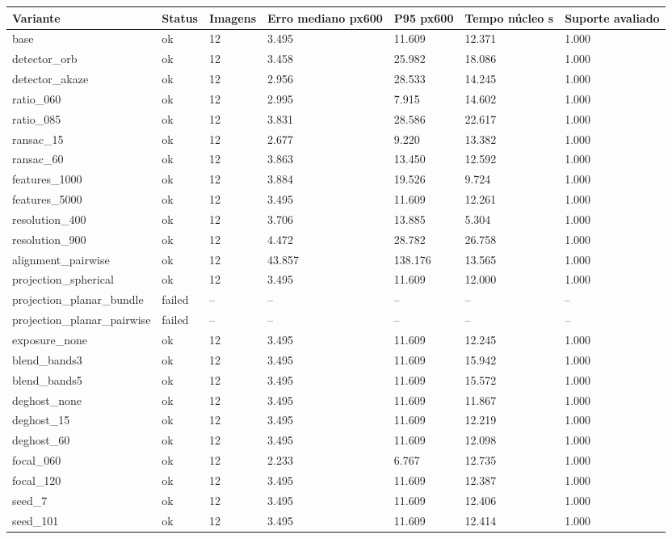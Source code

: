 \begin{tabular}{lllllll}
\hline
Variante & Status & Imagens & Erro mediano px600 & P95 px600 & Tempo núcleo s & Suporte avaliado \\ \hline
base & ok & 12 & 3.495 & 11.609 & 12.371 & 1.000 \\
detector\_orb & ok & 12 & 3.458 & 25.982 & 18.086 & 1.000 \\
detector\_akaze & ok & 12 & 2.956 & 28.533 & 14.245 & 1.000 \\
ratio\_060 & ok & 12 & 2.995 & 7.915 & 14.602 & 1.000 \\
ratio\_085 & ok & 12 & 3.831 & 28.586 & 22.617 & 1.000 \\
ransac\_15 & ok & 12 & 2.677 & 9.220 & 13.382 & 1.000 \\
ransac\_60 & ok & 12 & 3.863 & 13.450 & 12.592 & 1.000 \\
features\_1000 & ok & 12 & 3.884 & 19.526 & 9.724 & 1.000 \\
features\_5000 & ok & 12 & 3.495 & 11.609 & 12.261 & 1.000 \\
resolution\_400 & ok & 12 & 3.706 & 13.885 & 5.304 & 1.000 \\
resolution\_900 & ok & 12 & 4.472 & 28.782 & 26.758 & 1.000 \\
alignment\_pairwise & ok & 12 & 43.857 & 138.176 & 13.565 & 1.000 \\
projection\_spherical & ok & 12 & 3.495 & 11.609 & 12.000 & 1.000 \\
projection\_planar\_bundle & failed & -- & -- & -- & -- & -- \\
projection\_planar\_pairwise & failed & -- & -- & -- & -- & -- \\
exposure\_none & ok & 12 & 3.495 & 11.609 & 12.245 & 1.000 \\
blend\_bands3 & ok & 12 & 3.495 & 11.609 & 15.942 & 1.000 \\
blend\_bands5 & ok & 12 & 3.495 & 11.609 & 15.572 & 1.000 \\
deghost\_none & ok & 12 & 3.495 & 11.609 & 11.867 & 1.000 \\
deghost\_15 & ok & 12 & 3.495 & 11.609 & 12.219 & 1.000 \\
deghost\_60 & ok & 12 & 3.495 & 11.609 & 12.098 & 1.000 \\
focal\_060 & ok & 12 & 2.233 & 6.767 & 12.735 & 1.000 \\
focal\_120 & ok & 12 & 3.495 & 11.609 & 12.387 & 1.000 \\
seed\_7 & ok & 12 & 3.495 & 11.609 & 12.406 & 1.000 \\
seed\_101 & ok & 12 & 3.495 & 11.609 & 12.414 & 1.000 \\
\hline
\end{tabular}
